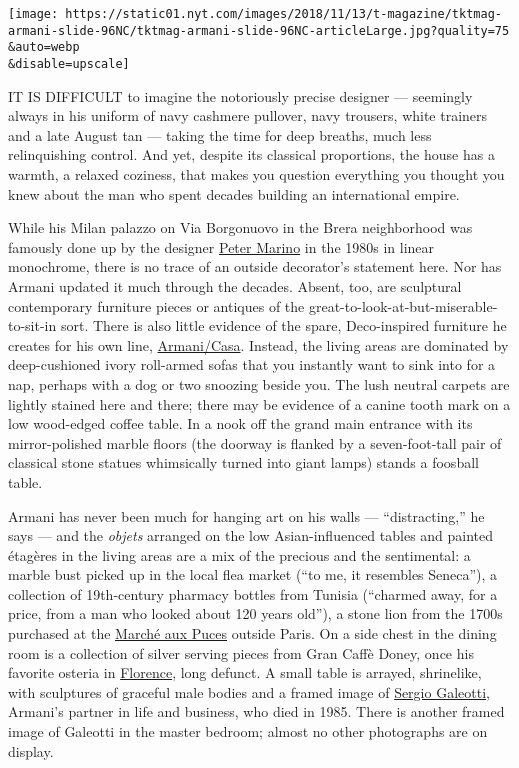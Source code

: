 \texttt{[image: https://static01.nyt.com/images/2018/11/13/t-magazine/tktmag-armani-slide-96NC/tktmag-armani-slide-96NC-articleLarge.jpg?quality=75\\\&auto=webp\\\&disable=upscale]}

IT IS DIFFICULT to imagine the notoriously precise designer ---
seemingly always in his uniform of navy cashmere pullover, navy
trousers, white trainers and a late August tan --- taking the time for
deep breaths, much less relinquishing control. And yet, despite its
classical proportions, the house has a warmth, a relaxed coziness, that
makes you question everything you thought you knew about the man who
spent decades building an international empire.

While his Milan palazzo on Via Borgonuovo in the Brera neighborhood was
famously done up by the designer
\href{https://www.nytimes.com/2012/03/11/magazine/peter-marino-likes-playing-bad-cop.html}{Peter
Marino} in the 1980s in linear monochrome, there is no trace of an
outside decorator's statement here. Nor has Armani updated it much
through the decades. Absent, too, are sculptural contemporary furniture
pieces or antiques of the great-to-look-at-but-miserable-to-sit-in sort.
There is also little evidence of the spare, Deco-inspired furniture he
creates for his own line,
\href{https://www.armani.com/casa/us/}{Armani/Casa}. Instead, the living
areas are dominated by deep-cushioned ivory roll-armed sofas that you
instantly want to sink into for a nap, perhaps with a dog or two
snoozing beside you. The lush neutral carpets are lightly stained here
and there; there may be evidence of a canine tooth mark on a low
wood-edged coffee table. In a nook off the grand main entrance with its
mirror-polished marble floors (the doorway is flanked by a
seven-foot-tall pair of classical stone statues whimsically turned into
giant lamps) stands a foosball table.

Armani has never been much for hanging art on his walls ---
``distracting,'' he says --- and the \emph{objets} arranged on the low
Asian-influenced tables and painted étagères in the living areas are a
mix of the precious and the sentimental: a marble bust picked up in the
local flea market (``to me, it resembles Seneca''), a collection of
19th-century pharmacy bottles from Tunisia (``charmed away, for a price,
from a man who looked about 120 years old''), a stone lion from the
1700s purchased at the
\href{https://www.nytimes.com/2014/11/30/travel/at-a-paris-flea-market-tips-for-treasure-hunters.html}{Marché
aux Puces} outside Paris. On a side chest in the dining room is a
collection of silver serving pieces from Gran Caffè Doney, once his
favorite osteria in
\href{https://www.nytimes.com/2014/09/28/travel/things-to-do-in-36-hours-in-florence-italy.html}{Florence},
long defunct. A small table is arrayed, shrinelike, with sculptures of
graceful male bodies and a framed image of
\href{https://www.nytimes.com/1985/08/16/nyregion/sergio-galeotti.html}{Sergio
Galeotti}, Armani's partner in life and business, who died in 1985.
There is another framed image of Galeotti in the master bedroom; almost
no other photographs are on display.

